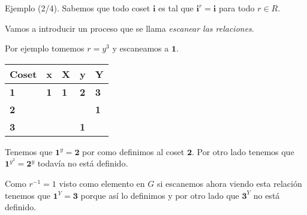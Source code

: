 \documentclass[aspectratio=169, 9pt]{beamer}
\begin{document}
\begin{frame}[fragile]{Ejemplo (2/4).}
\pause
Sabemos que todo coset $\textbf{i}$ es tal que $\textbf{i}^r = \textbf{i}$ para todo $r \in R$.
\pause

Vamos a introducir un proceso que se llama \textit{escanear las relaciones}.

\pause
Por ejemplo tomemos $r = y^3$ y escaneamos a $\textbf{1}$.


\begin{table}[]
	\begin{tabular}{|l|l|l|l|l|}
		\hline
		Coset     & x          & X          & y          & Y          \\ \hline
		\textbf{1} & \textbf{1} & \textbf{1} & \textbf{2} & \textbf{3} \\ \hline
		\textbf{2} &            &            &            &  \textbf{1}          \\ \hline
		\textbf{3} &            &            &     \textbf{1}       &            \\ \hline
	\end{tabular}
\end{table}
\pause

Tenemos que $\textbf{1}^y = \textbf{2}$ por como definimos al coset $\textbf{2}$. 
Por otro lado tenemos que $\textbf{1}^{y^2} = \textbf{2}^y$ todavía no está definido.
\pause


Como $r^{-1} = 1$ visto como elemento en $G$ si escanemos ahora viendo esta relación tenemos que $\textbf{1}^{Y} = \textbf{3}$ porque así lo definimos y por otro lado que $\textbf{3}^{Y}$ no está definido.
\pause

\end{frame}
\end{document}
